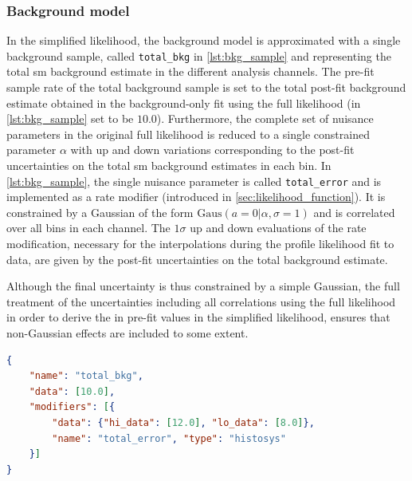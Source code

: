 \subsubsection{Background model}

In the simplified likelihood, the background model is approximated with a single background sample, called \texttt{total\_bkg} in \cref{lst:bkg_sample} and representing the total \gls{sm} background estimate in the different analysis channels.
The pre-fit sample rate of the total background sample is set to the total post-fit background estimate obtained in the background-only fit using the full likelihood (in \cref{lst:bkg_sample} set to be $10.0$).
Furthermore, the complete set of nuisance parameters in the original full likelihood is reduced to a single constrained parameter $\alpha$ with up and down variations corresponding to the post-fit uncertainties on the total \gls{sm} background estimates in each bin.
In \cref{lst:bkg_sample}, the single nuisance parameter is called \texttt{total\_error} and is implemented as a rate modifier (introduced in \cref{sec:likelihood_function}).
It is constrained by a Gaussian of the form $\mathrm{Gaus}(a = 0 \vert \alpha , \sigma = 1)$ and is correlated over all bins in each channel. The $1\sigma$ up and down evaluations of the rate modification, necessary for the interpolations during the profile likelihood fit to data, are given by the post-fit uncertainties on the total background estimate.

Although the final uncertainty is thus constrained by a simple Gaussian, the full treatment of the uncertainties including all correlations using the full likelihood in order to derive the in pre-fit values in the simplified likelihood, ensures that non-Gaussian effects are included to some extent.

\begin{minipage}{\linewidth}
\begin{lstlisting}[language=json,firstnumber=1,caption={Example of a total background sample with sample rate and total uncertainty as derived from a previous fit in the \glspl{sr} and \glspl{cr}. The `\textit{histosys}' type modifier in \lib{HistFactory} implements a shape uncertainty correlated over all bins.},captionpos=b, label=lst:bkg_sample]
{
	"name": "total_bkg",
	"data": [10.0],
	"modifiers": [{
		"data": {"hi_data": [12.0], "lo_data": [8.0]}, 
		"name": "total_error", "type": "histosys"
	}]
}
\end{lstlisting}
\end{minipage}

